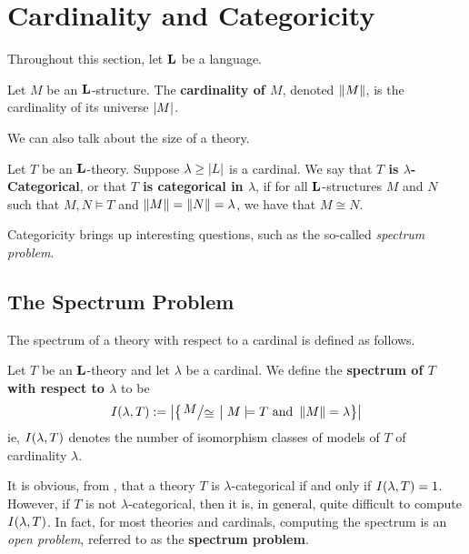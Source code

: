 \section{Cardinality and Categoricity}

Throughout this section, let $\mathbf{L}$ be a language.

\begin{boxdefinition}
    Let $M$ be an $\mathbf{L}$-structure. The \textbf{cardinality of $M$}, denoted $\left\lVert M \right\rVert$, is the cardinality of its universe $\left\lvert M \right\rvert$.
\end{boxdefinition}

We can also talk about the size of a theory.

\begin{boxdefinition}\label{Ch1:Def:Categoricity}
    Let $T$ be an $\mathbf{L}$-theory. Suppose $\lambda \geq \left\lvert L \right\rvert$ is a cardinal. We say that \textbf{$T$ is $\lambda$-Categorical}, or that \textbf{$T$ is categorical in $\lambda$}, if for all $\mathbf{L}$-structures $M$ and $N$ such that $M, N \models T$ and $\left\lVert M \right\rVert = \left\lVert N \right\rVert = \lambda$, we have that $M \cong N$.
\end{boxdefinition}

Categoricity brings up interesting questions, such as the so-called \textit{spectrum problem}.

\subsection{The Spectrum Problem}

The spectrum of a theory with respect to a cardinal is defined as follows.

\begin{boxdefinition}[Spectrum]
    Let $T$ be an $\mathbf{L}$-theory and let $\lambda$ be a cardinal. We define the \textbf{spectrum of $T$ with respect to $\lambda$} to be
    \begin{align*}
        I\of{\lambda, T} := \abs{
            \setst{\quotient{M}{\cong}}{M \models T \text{ and } \norm{M} = \lambda}
        }
    \end{align*}
    ie, $I\!\left( \lambda, T \right)$ denotes the number of isomorphism classes of models of $T$ of cardinality $\lambda$.
\end{boxdefinition}

It is obvious, from , that a theory $T$ is $\lambda$-categorical if and only if $I\!\left( \lambda, T \right) = 1$. However, if $T$ is not $\lambda$-categorical, then it is, in general, quite difficult to compute $I\!\left( \lambda, T \right)$. In fact, for most theories and cardinals, computing the spectrum is an \textit{open problem}, referred to as the \textbf{spectrum problem}.

